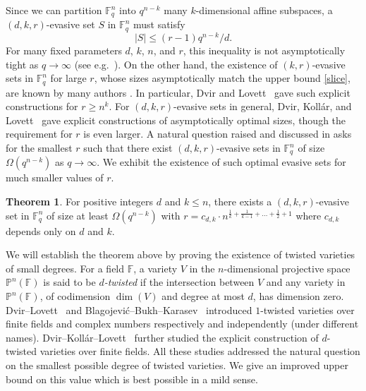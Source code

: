 \documentclass[11pt]{article}
\theoremstyle{definition}
\newtheorem{theorem}{Theorem}[section]
\begin{document}
Since we can partition $\mathbb{F}_q^n$ into $q^{n-k}$ many $k$-dimensional affine subspaces, a $(d,k,r)$-evasive set $S$ in $\mathbb{F}_q^n$ must satisfy \begin{equation}\label{slice}
    |S| \leq (r-1) q^{n-k} / d.
\end{equation} For many fixed parameters $d$, $k$, $n$, and $r$, this inequality is not asymptotically tight as $q \to \infty$ (see e.g.~\cite{ihringer2022large}). On the other hand, the existence of $(k,r)$-evasive sets in $\mathbb{F}_q^n$ for large $r$, whose sizes asymptotically match the upper bound \eqref{slice}, are known by many authors \cite{dvir2012subspace,blagojevic2013turan,sudakov2024evasive,ihringer2022large,conlon}. In particular, Dvir and Lovett~\cite{dvir2012subspace} gave such explicit constructions for $r \geq n^k$. For $(d,k,r)$-evasive sets in general, Dvir, Koll\'ar, and Lovett~\cite{dvir2014variety} gave explicit constructions of asymptotically optimal sizes, though the requirement for $r$ is even larger. A natural question raised and discussed in \cite{sudakov2024evasive} asks for the smallest $r$ such that there exist $(d,k,r)$-evasive sets in $\mathbb{F}_q^n$ of size $\Omega\left(q^{n-k}\right)$ as $q\to \infty$. We exhibit the existence of such optimal evasive sets for much smaller values of $r$.

\begin{theorem}\label{evasive}
    For positive integers $d$ and $k \leq n$, there exists a $(d,k,r)$-evasive set in $\mathbb{F}_q^n$ of size at least $\Omega\left(q^{n-k}\right)$ with $r = c_{d,k} \cdot n^{\frac{1}{k} + \frac{1}{k-1} + \dots + \frac{1}{2} + 1}$ where $c_{d,k}$ depends only on $d$ and $k$.
\end{theorem}

We will establish the theorem above by proving the existence of twisted varieties of small degrees. For a field $\mathbb{F}$, a variety $V$ in the $n$-dimensional projective space $\mathbb{P}^n(\mathbb{F})$ is said to be \textit{$d$-twisted} if the intersection between $V$ and any variety in $\mathbb{P}^n(\mathbb{F})$, of codimension $\dim(V)$ and degree at most $d$, has dimension zero. Dvir--Lovett~\cite{dvir2012subspace} and Blagojevi\'c--Bukh--Karasev~\cite{blagojevic2013turan} introduced $1$-twisted varieties over finite fields and complex numbers respectively and independently (under different names). Dvir--Koll\'ar--Lovett~\cite{dvir2014variety} further studied the explicit construction of $d$-twisted varieties over finite fields. All these studies addressed the natural question on the smallest possible degree of twisted varieties. We give an improved upper bound on this value which is best possible in a mild sense.
\end{document}
